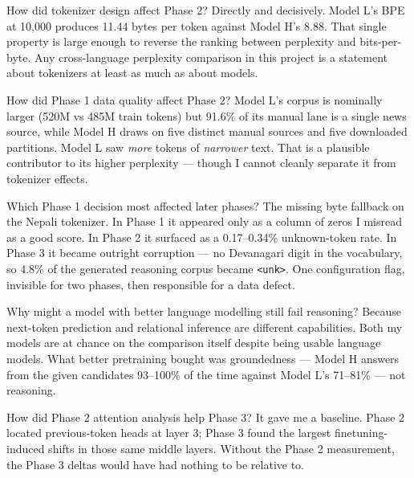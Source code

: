 \documentclass[11pt]{report}
\begin{document}
\begin{qabox}{How did tokenizer design affect Phase 2?}
Directly and decisively. Model L's BPE at 10,000 produces 11.44 bytes per token
against Model H's 8.88. That single property is large enough to reverse the
ranking between perplexity and bits-per-byte. Any cross-language perplexity
comparison in this project is a statement about tokenizers at least as much as
about models.
\end{qabox}

\begin{qabox}{How did Phase 1 data quality affect Phase 2?}
Model L's corpus is nominally larger (520M vs 485M train tokens) but 91.6\% of
its manual lane is a single news source, while Model H draws on five distinct
manual sources and five downloaded partitions. Model L saw \emph{more} tokens of
\emph{narrower} text. That is a plausible contributor to its higher perplexity
--- though I cannot cleanly separate it from tokenizer effects.
\end{qabox}

\begin{qabox}{Which Phase 1 decision most affected later phases?}
The missing byte fallback on the Nepali tokenizer. In Phase 1 it appeared only
as a column of zeros I misread as a good score. In Phase 2 it surfaced as a
0.17--0.34\% unknown-token rate. In Phase 3 it became outright corruption --- no
Devanagari digit in the vocabulary, so 4.8\% of the generated reasoning corpus
became \texttt{<unk>}. One configuration flag, invisible for two phases, then
responsible for a data defect.
\end{qabox}

\begin{qabox}{Why might a model with better language modelling still fail reasoning?}
Because next-token prediction and relational inference are different
capabilities. Both my models are at chance on the comparison itself despite
being usable language models. What better pretraining bought was groundedness
--- Model H answers from the given candidates 93--100\% of the time against
Model L's 71--81\% --- not reasoning.
\end{qabox}

\begin{qabox}{How did Phase 2 attention analysis help Phase 3?}
It gave me a baseline. Phase 2 located previous-token heads at layer 3; Phase 3
found the largest finetuning-induced shifts in those same middle layers.
Without the Phase 2 measurement, the Phase 3 deltas would have had nothing to
be relative to.
\end{qabox}
\end{document}
